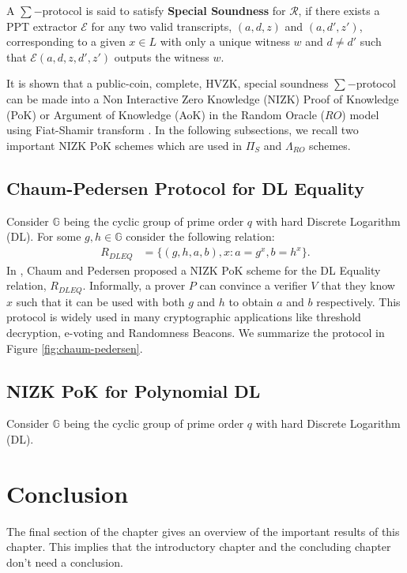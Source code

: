 \begin{definition}
  A $\sum-$protocol is said to satisfy \textbf{Special Soundness} for $\mathcal{R}$, 
  if there exists a PPT extractor $\mathcal{E}$ for any two valid transcripts, $(a,d,z)$ and 
  $(a,d',z')$, corresponding to a given $x\in L$ with only a unique witness $w$ and $d\neq d'$ such that $\mathcal{E}(a,d,z,d',z')$ outputs the 
  witness $w$. 
\end{definition}

It is shown that a public-coin, complete, HVZK, special soundness $\sum-$protocol can be made into a
Non Interactive Zero Knowledge (NIZK) Proof of Knowledge (PoK) or Argument of Knowledge (AoK) in the 
Random Oracle ($RO$) model using Fiat-Shamir transform \cite{10.1007/3-540-47721-7_12}. 
In the following subsections, we recall two important NIZK PoK schemes which are used in $\Pi_S$ and 
$\Lambda_{RO}$ schemes.

\subsection{Chaum-Pedersen Protocol for DL Equality}
Consider $\mathbb{G}$ being the cyclic group of prime order $q$ with hard Discrete Logarithm (DL). 
For some $g,h\in \mathbb{G}$ consider the following relation:
\begin{align*}
  R_{DLEQ} &= \{(g,h,a,b),x : a=g^x, b=h^x\}.
\end{align*}
In \cite{10.1007/3-540-48071-4_7}, Chaum and Pedersen proposed a NIZK PoK scheme for the DL Equality 
relation, $R_{DLEQ}$. Informally, a prover $P$ can convince a verifier $V$ that they know $x$ such that
it can be used with both $g$ and $h$ to obtain $a$ and $b$ respectively. This protocol is widely used in
many cryptographic applications like threshold decryption, e-voting and Randomness Beacons. 
We summarize the protocol in Figure \ref{fig:chaum-pedersen}.


\subsection{NIZK PoK for Polynomial DL}
Consider $\mathbb{G}$ being the cyclic group of prime order $q$ with hard Discrete Logarithm (DL). 

\section{Conclusion}
The final section of the chapter gives an overview of the important results
of this chapter. This implies that the introductory chapter and the
concluding chapter don't need a conclusion.

